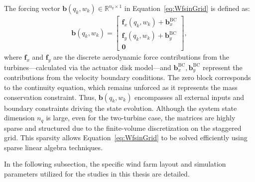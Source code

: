The forcing vector $\bm{b}(q_k, w_k) \in \mathbb{R}^{n_q\times 1}$ in Equation~\eqref{eq:WfsinGrid} is defined as:
\begin{align} \label{eq:bGrid}\bm{b}(q_k, w_k) =\begin{bmatrix}\bm{f}_x(q_k, w_k) + \bm{b}_x^\mathrm{BC} \\ \bm{f}_y(q_k, w_k) + \bm{b}_y^\mathrm{BC} \\ \bm{0}\end{bmatrix},\end{align}
where $\bm{f}_x$ and $\bm{f}_y$ are the discrete aerodynamic force contributions from the turbines—calculated via the actuator disk model—and $\bm{b}_x^\mathrm{BC}, \bm{b}_y^\mathrm{BC}$ represent the contributions from the velocity boundary conditions. The zero block corresponds to the continuity equation, which remains unforced as it represents the mass conservation constraint. Thus, $\bm{b}(q_k, w_k)$ encompasses all external inputs and boundary constraints driving the state evolution. Although the system state dimension $n_q$ is large, even for the two-turbine case, the matrices are highly sparse and structured due to the finite-volume discretization on the staggered grid. This sparsity allows Equation~\eqref{eq:WfsinGrid} to be solved efficiently using sparse linear algebra techniques.

In the following subsection, the specific wind farm layout and simulation parameters utilized for the studies in this thesis are detailed.
